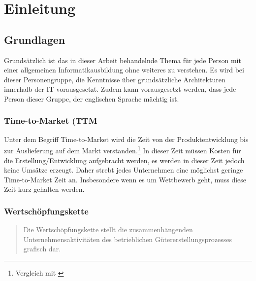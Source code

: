 \chapter{Einleitung}
\label{chap:einleitung}

\section{Grundlagen}
\label{sec:Grundlagen}
Grundsätzlich ist das in dieser Arbeit behandelnde Thema für jede Person mit einer allgemeinen Informatikausbildung ohne weiteres zu verstehen. Es wird bei dieser Personengruppe, die Kenntnisse über grundsätzliche Architekturen innerhalb der IT vorausgesetzt. Zudem kann vorausgesetzt werden, dass jede Person dieser Gruppe, der englischen Sprache mächtig ist.

\subsection{Time-to-Market (TTM}
\label{subsec:ttm}
Unter dem Begriff Time-to-Market wird die Zeit von der Produktentwicklung bis zur Auslieferung auf dem Markt verstanden.\footnote{Vergleich mit \cite{ttm:BusinessDictionary}}  In dieser Zeit müssen Kosten für die Erstellung/Entwicklung aufgebracht werden, es werden in dieser Zeit jedoch keine Umsätze erzeugt. Daher strebt jedes Unternehmen eine möglichst geringe Time-to-Market Zeit an. Insbesondere wenn es um Wettbewerb geht, muss diese Zeit kurz gehalten werden.

\subsection{Wertschöpfungskette}
\label{subsec:Wertschoepfungskette}
\begin{quotation}
\frqq Die Wertschöpfungskette stellt die zusammenhängenden Unternehmensaktivitäten des betrieblichen Gütererstellungsprozesses grafisch dar.\flqq \cite{gabler}
\end{quotation}

